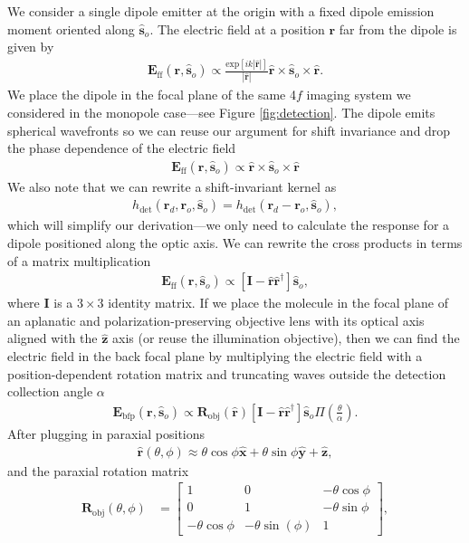\documentclass{osa-article}
\providecommand{\mb}[1]{\mathbf{#1}}
\providecommand{\ro}{\mathbf{\mathbf{r}}_o}
\providecommand{\so}{\mathbf{\hat{s}}_o}
\providecommand{\rd}{\mathbf{r}_d}
\providecommand{\mh}[1]{\mathbf{\hat{#1}}}
\begin{document}
We consider a single dipole emitter at the origin with a fixed dipole emission
moment oriented along $\so{}$. The electric field at a position $\mb{r}$ far
from the dipole is given by
\begin{align}
  \mb{E}_{\text{ff}}(\mb{r}, \so{}) \propto \frac{\text{exp}[ik|\mh{r}|]}{|\mh{r}|}\mh{r} \times \so{} \times \mh{r}. \label{eq:ff}
\end{align}
We place the dipole in the focal plane of the same 4$f$ imaging system we
considered in the monopole case---see Figure \ref{fig:detection}. The dipole emits
spherical wavefronts so we can reuse our argument for shift invariance and drop
the phase dependence of the electric field
\begin{align}
  \mb{E}_{\text{ff}}(\mb{r}, \so{}) \propto \mh{r} \times \so{} \times \mh{r} \label{eq:ff2}
\end{align}
We also note that we can rewrite a shift-invariant kernel as
\begin{align}
h_{\text{det}}(\rd, \ro, \so) = h_{\text{det}}(\rd - \ro, \so), 
\end{align}
which will simplify our derivation---we only need to calculate the response for
a dipole positioned along the optic axis. We can rewrite the cross products in terms
of a matrix multiplication
\begin{align}
  \mb{E}_{\text{ff}}(\mb{r}, \so{}) \propto [\mb{I} - \mh{r}\mh{r}^{\dagger}]\so,
\end{align}
where $\mb{I}$ is a $3\times 3$ identity matrix. If we place the molecule in the
focal plane of an aplanatic and polarization-preserving objective lens with its
optical axis aligned with the $\mh{z}$ axis (or reuse the illumination
objective), then we can find the electric field in the back focal plane by
multiplying the electric field with a position-dependent rotation matrix and
truncating waves outside the detection collection angle $\alpha$
\begin{align}
  \mb{E}_{\text{bfp}}(\mb{r}, \so{}) \propto \mb{R}_{\text{obj}}(\mh{r})[\mb{I} - \mh{r}\mh{r}^{\dagger}]\so\Pi\left(\frac{\theta}{\alpha}\right).
\end{align}
After plugging in paraxial positions
\begin{align}
  \mh{r}(\theta,\phi) \approx \theta\cos\phi\mh{x} + \theta\sin\phi\mh{y} + \mh{z},
\end{align}
and the paraxial rotation matrix
\begin{align}
  \mb{R}_{\text{obj}}(\theta, \phi) &=
  \begin{bmatrix}
    1 & 0 &-\theta \cos\phi\\
    0 & 1 &-\theta \sin\phi\\
    -\theta\cos\phi&-\theta \sin(\phi)&1
  \end{bmatrix},
\end{align}
\end{document}
